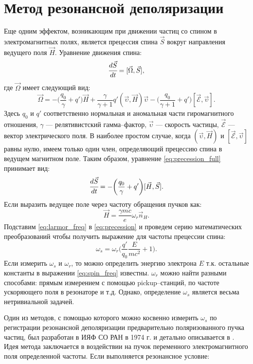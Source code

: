 \section{Метод резонансной деполяризации}
Еще одним эффектом, возникающим при движении частиц со спином в электромагнитных полях, является прецессия спина $\vec{S}$ вокруг направления ведущего поля $\vec{H}$. Уравнение движения спина:
\begin{equation}
\cfrac{d\vec{S}}{dt} = [\vec{\Omega},\vec{S}],
\label{eq:precession_full}
\end{equation}
где $\vec{\Omega}$ имеет следующий вид:
\begin{equation}
\vec{\Omega} = -\biggl(\frac{q_0}{\gamma}+q'\biggr) \vec{H} + \frac{\gamma}{\gamma + 1}q' (\vec{\upsilon},\vec{H})\vec{\upsilon}- \biggl(\frac{q_0}{\gamma+1}  + q'\biggr)[\vec{\mathcal{E}},\vec{\upsilon}].
\end{equation}%
Здесь $q_0$ и $q'$ соответственно нормальная и аномальная части гиромагнитного отношения, $\gamma$ --- релятивистский гамма--фактор, $\vec{\upsilon}$ --- скорость частицы, $\vec{\mathcal{E}}$ --- вектор электрического поля.
В наиболее простом случае, когда $(\vec{\upsilon}, \vec{H})$ и $[\vec{\mathcal{E}},\vec{\upsilon}]$ равны нулю, имеем только один член, определяющий прецессию спина в ведущем магнитном поле. Таким образом, уравнение \ref{eq:precession_full} принимает вид:
\begin{equation}
\cfrac{d\vec{S}}{dt} = -\biggl(\frac{q_0}{\gamma}+q'\biggr) [\vec{H}, \vec{S}].
\label{eq:precession}
\end{equation}%
Если выразить ведущее поле через частоту обращения пучков как: 
\begin{equation}
\vec{H} = \frac {\gamma mc}{e}\omega_r\vec{n}_H.
\label{eq:larmor_freq}
\end{equation}
Подставим \ref{eq:larmor_freq} в \ref{eq:precession} и проведем серию математических преобразований чтобы получить выражение для частоты прецессии спина:
\begin{equation}
\omega_s=  \omega_{r}\bigg(\frac{q'}{q_0}\frac{E}{mc^2}+1\bigg).
\label{eq:spin_freq}
\end{equation}
Если измерить $\omega_s$ и $\omega_{r}$, то можно определить энергию электрона $E$ т.к. остальные константы в выражении \ref{eq:spin_freq} известны. $\omega_{r}$ можно найти разными способами: прямым измерением с помощью pickup--станций, по частоте ускоряющего поля в резонаторе и т.д. Однако, определение $\omega_s$ является весьма нетривиальной задачей. 
\par Один из методов, с помощью которого можно косвенно измерить  $\omega_s$ по регистрации резонансной деполяризации предварительно поляризованного пучка частиц, был разработан в ИЯФ СО РАН в 1974 г. и детально описывается в \cite{MRD}. Идея метода заключается в воздействии на пучок переменного электромагнитного поля определенной частоты. Если выполняется резонансное условие:
